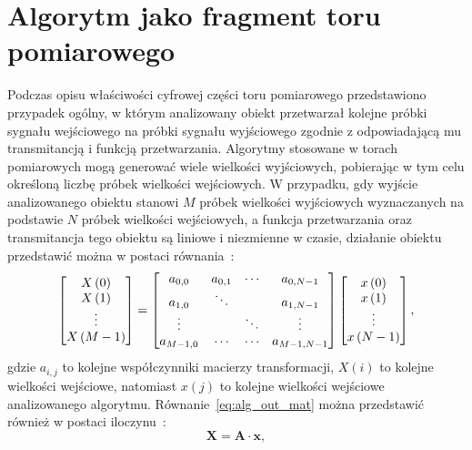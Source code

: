 \section{Algorytm jako fragment toru pomiarowego}

Podczas opisu właściwości cyfrowej części toru pomiarowego przedstawiono przypadek ogólny, w którym analizowany obiekt przetwarzał kolejne próbki sygnału wejściowego na próbki sygnału wyjściowego zgodnie z odpowiadającą mu transmitancją i funkcją przetwarzania. Algorytmy stosowane w torach pomiarowych mogą generować wiele wielkości wyjściowych, pobierając w tym celu określoną liczbę próbek wielkości wejściowych. W przypadku, gdy wyjście analizowanego obiektu stanowi $M$ próbek wielkości wyjściowych wyznaczanych na podstawie $N$ próbek wielkości wejściowych, a funkcja przetwarzania oraz transmitancja tego obiektu są liniowe i niezmienne w czasie, działanie obiektu przedstawić można w postaci równania~\cite{jakubiec_algorithms, jakubiec_single}:
\begin{equation}
\begin{bmatrix}
X \left(0\right)   \\
X \left(1\right)   \\
\vdots      \\
X \left(M-1\right)
\end{bmatrix}
=
\begin{bmatrix}
a_{0, 0}   &   a_{0, 1} &   \cdots   &   a_{0, N-1}      \\
a_{1, 0}   &   \ddots   &            &   a_{1, N-1}      \\
\vdots     &            &   \ddots   &   \vdots          \\
a_{M-1, 0} &   \cdots   &   \cdots   &   a_{M-1, N-1}
\end{bmatrix}
\begin{bmatrix}
x \left(0\right)   \\
x \left(1\right)   \\
\vdots      \\
x \left(N-1\right)
\end{bmatrix}
\label{eq:alg_out_mat},
\end{equation}
gdzie $a_{i,j}$ to kolejne współczynniki macierzy transformacji, $X(i)$ to kolejne wielkości wejściowe, natomiast $x(j)$ to kolejne wielkości wejściowe analizowanego algorytmu. Równanie~\eqref{eq:alg_out_mat} można przedstawić również w postaci iloczynu~\cite{jakubiec_algorithms}:
\begin{equation}
\mathbf{X} = \mathbf{A} \cdot \mathbf{x} \label{eq:alg_out_mul},
\end{equation}
